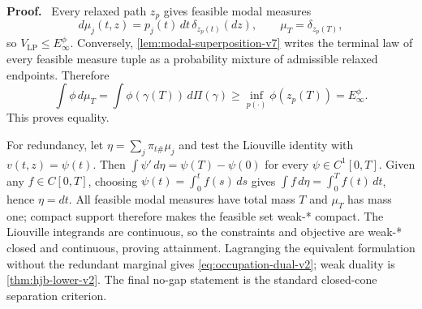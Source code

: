 \documentclass[twoside,11pt]{article}
\renewenvironment{proof}[1][Proof]{\par\noindent\textbf{#1.}\ }{\hfill\BlackBox\par\medskip}
\begin{document}
\begin{proof}
Every relaxed path $z_p$ gives feasible modal measures
\[
 d\mu_j(t,z)=p_j(t)\,dt\,\delta_{z_p(t)}(dz),
 \qquad \mu_T=\delta_{z_p(T)},
\]
so $V_{\mathrm{LP}}\le E_\infty^\phi$.  Conversely,
\cref{lem:modal-superposition-v7} writes the terminal law of every feasible
measure tuple as a probability mixture of admissible relaxed endpoints.
Therefore
\[
 \int\phi\,d\mu_T
 =\int\phi(\gamma(T))\,d\Pi(\gamma)
 \ge\inf_{p(\cdot)}\phi(z_p(T))=E_\infty^\phi.
\]
This proves equality.

For redundancy, let $\eta=\sum_j\pi_{t\#}\mu_j$ and test the Liouville
identity with $v(t,z)=\psi(t)$.  Then
$\int\psi'\,d\eta=\psi(T)-\psi(0)$ for every $\psi\in C^1[0,T]$.
Given any $f\in C[0,T]$, choosing
$\psi(t)=\int_0^tf(s)\,ds$ gives
$\int f\,d\eta=\int_0^Tf(t)\,dt$, hence $\eta=dt$.
All feasible modal measures have total mass $T$ and $\mu_T$ has mass one;
compact support therefore makes the feasible set weak-* compact.  The
Liouville integrands are continuous, so the constraints and objective are
weak-* closed and continuous, proving attainment.  Lagranging the equivalent
formulation without the redundant marginal gives
\eqref{eq:occupation-dual-v2}; weak duality is
\cref{thm:hjb-lower-v2}.  The final no-gap statement is the standard closed-cone
separation criterion.
\end{proof}
\end{document}
